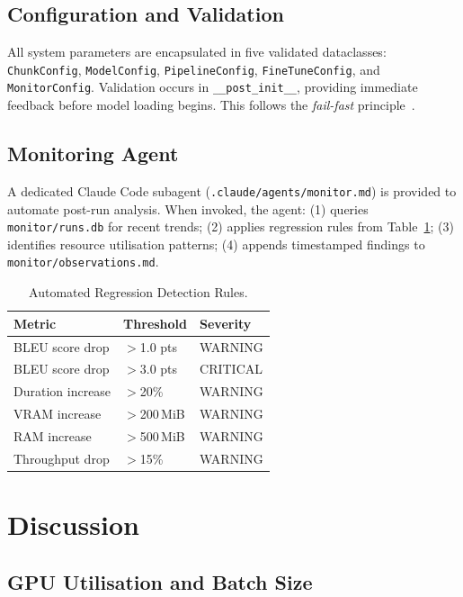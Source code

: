 \documentclass[conference]{IEEEtran}
\begin{document}
\subsection{Configuration and Validation}

All system parameters are encapsulated in five validated dataclasses:
\texttt{ChunkConfig}, \texttt{ModelConfig}, \texttt{PipelineConfig},
\texttt{FineTuneConfig}, and \texttt{MonitorConfig}.
Validation occurs in \texttt{\_\_post\_init\_\_}, providing immediate feedback before
model loading begins. This follows the \textit{fail-fast} principle~\cite{shore2004fail}.

\subsection{Monitoring Agent}

A dedicated Claude Code subagent (\texttt{.claude/agents/monitor.md}) is provided
to automate post-run analysis. When invoked, the agent:
(1) queries \texttt{monitor/runs.db} for recent trends;
(2) applies regression rules from Table~\ref{tab:regression};
(3) identifies resource utilisation patterns;
(4) appends timestamped findings to \texttt{monitor/observations.md}.

\begin{table}[htbp]
\caption{Automated Regression Detection Rules.}
\label{tab:regression}
\centering
\small
\begin{tabular}{lll}
\toprule
Metric & Threshold & Severity \\
\midrule
BLEU score drop & $>$1.0 pts & WARNING \\
BLEU score drop & $>$3.0 pts & CRITICAL \\
Duration increase & $>$20\% & WARNING \\
VRAM increase & $>$200\,MiB & WARNING \\
RAM increase & $>$500\,MiB & WARNING \\
Throughput drop & $>$15\% & WARNING \\
\bottomrule
\end{tabular}
\end{table}

\section{Discussion}

\subsection{GPU Utilisation and Batch Size}
\end{document}
